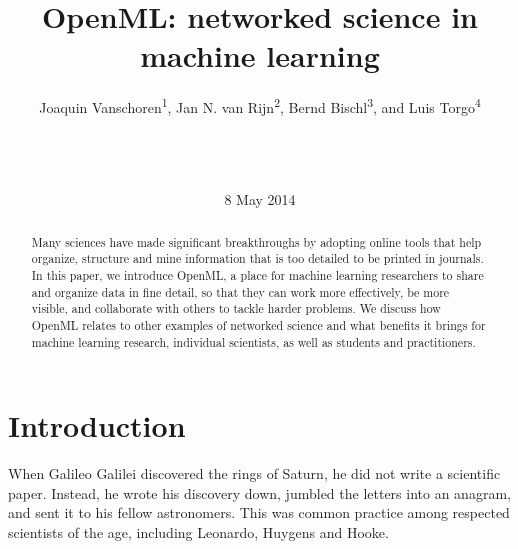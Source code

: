 \documentclass{acmproc-sp}
\begin{document}
\title{OpenML: networked science in machine learning}


\author{\alignauthor Joaquin Vanschoren\textsuperscript{1}, Jan N. van Rijn\textsuperscript{2}, Bernd Bischl\textsuperscript{3}, and Luis Torgo\textsuperscript{4} \\
\\
\\
\\
}

\date{8 May 2014}
\maketitle
\begin{abstract}
Many sciences have made significant breakthroughs by adopting online tools that help organize, structure and mine information that is too detailed to be printed in journals. In this paper, we introduce OpenML, a place for machine learning researchers to share and organize data in fine detail, so that they can work more effectively, be more visible, and collaborate with others to tackle harder problems. We discuss how OpenML relates to other examples of networked science and what benefits it brings for machine learning research, individual scientists, as well as students and practitioners.
\end{abstract}

\section{Introduction}
When Galileo Galilei discovered the rings of Saturn, he did not write a scientific paper. Instead, he wrote his discovery down, jumbled the letters into an anagram, and sent it to his fellow astronomers. This was common practice among respected scientists of the age, including Leonardo, Huygens and Hooke.
\end{document}

